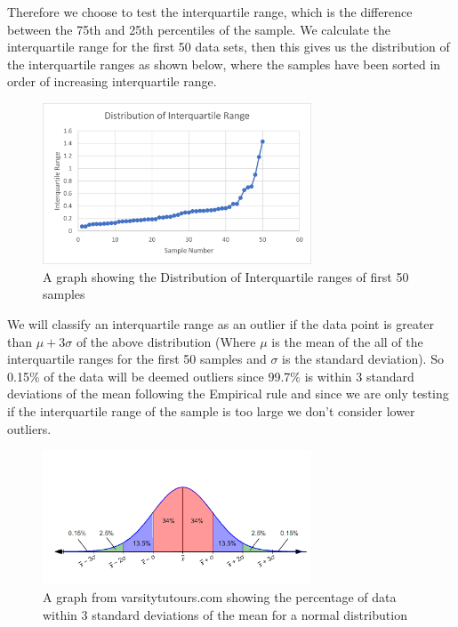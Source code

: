 \documentclass[11pt]{article}
\begin{document}
Therefore we choose to test the interquartile range, which is the difference between the 75th and 25th percentiles of the sample. We calculate the interquartile range for the first 50 data sets, then this gives us the distribution of the interquartile ranges as shown below, where the samples have been sorted in order of increasing interquartile range. 


\begin{figure}[H]
    \centering
    \includegraphics[width=80mm]{distributionofinterquartilerange.png}
    \caption{A graph showing the Distribution of Interquartile ranges of first 50 samples}
    \label{figure 3}
\end{figure}


We will classify an interquartile range as an outlier if the data point is greater than $\mu+3\sigma$ of the above distribution
(Where $\mu$ is the mean of the all of the interquartile ranges for the first 50 samples and $\sigma$ is the standard deviation).
So 0.15$\%$ of the data will be deemed outliers since 99.7$\%$ is within 3 standard deviations of the mean following the Empirical rule and since we are only testing if the interquartile range of the sample is too large we don’t consider lower outliers.


\begin{figure}[H]
    \centering
    \includegraphics[width=80mm]{Outliers.png}
    \caption{A graph from varsitytutours.com \cite{Varsitytutors} showing the percentage of data within 3 standard deviations of the mean for a normal distribution}
    \label{figure 4}
\end{figure}
\end{document}
